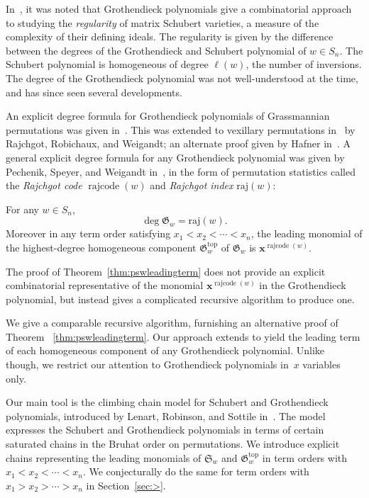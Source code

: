 \documentclass[ALCO]{cedram}
\newcommand{\absrajcode}[1]{\mathrm{raj}(#1)}
\DeclareMathOperator{\rr}{\mathrm{rajcode}}
\begin{document}
In~\cite{symmgrothdeg}, it was noted that Grothendieck polynomials give a combinatorial approach to studying the \emph{regularity} of matrix Schubert varieties, a measure of the complexity of their defining ideals. The regularity is given by the difference between the degrees of the Grothendieck and Schubert polynomial of $w\in S_n$. The Schubert polynomial is homogeneous of degree $\ell(w)$, the number of inversions. The degree of the Grothendieck polynomial was not well-understood at the time, and has since seen several developments.

An explicit degree formula for Grothendieck polynomials of Grassmannian permutations was given in~\cite{symmgrothdeg}. This was extended to vexillary permutations in~\cite{vexgrothdeg} by Rajchgot, Robichaux, and Weigandt; an alternate proof given by Hafner in~\cite{elena1}. A general explicit degree formula for any Grothendieck polynomial was given by Pechenik, Speyer, and Weigandt in~\cite{PSW}, in the form of permutation statistics called the \emph{Rajchgot code} $\rr(w)$ and \emph{Rajchgot index} $\absrajcode{w}$:	
\begin{theorem}
	\label{thm:pswleadingterm}
	For any $w\in S_n$,
	\[\deg \mathfrak{G}_w=\absrajcode{w}.\]
	Moreover in any term order satisfying $x_1<x_2<\cdots<x_n$, the leading monomial of the highest-degree homogeneous component $\mathfrak{G}_w^{\mathrm{top}}$ of $\mathfrak{G}_w$ is $\bm{x}^{\rr(w)}$.
\end{theorem}
The proof of Theorem~\ref{thm:pswleadingterm} does not provide an explicit combinatorial representative of the monomial $\bm{x}^{\rr(w)}$ in the Grothendieck polynomial, but instead gives a complicated recursive algorithm to produce one. 

We give a comparable recursive algorithm, furnishing an alternative proof of Theorem ~\ref{thm:pswleadingterm}. Our approach extends to yield the leading term of each homogeneous component of any Grothendieck polynomial. Unlike~\cite{PSW} though, we restrict our attention to Grothendieck polynomials in~$x$ variables only. 

Our main tool is the climbing chain model for Schubert and Grothendieck polynomials, introduced by Lenart, Robinson, and Sottile in~\cite{LRS}. The model expresses the Schubert and Grothendieck polynomials in terms of certain saturated chains in the Bruhat order on permutations. We introduce explicit chains representing the leading monomials of $\mathfrak{S}_w$ and $\mathfrak{G}_w^{\mathrm{top}}$ in term orders with $x_1<x_2<\cdots<x_n$. We conjecturally do the same for term orders with $x_1>x_2>\cdots>x_n$ in Section~\ref{sec:>}. 
\end{document}
